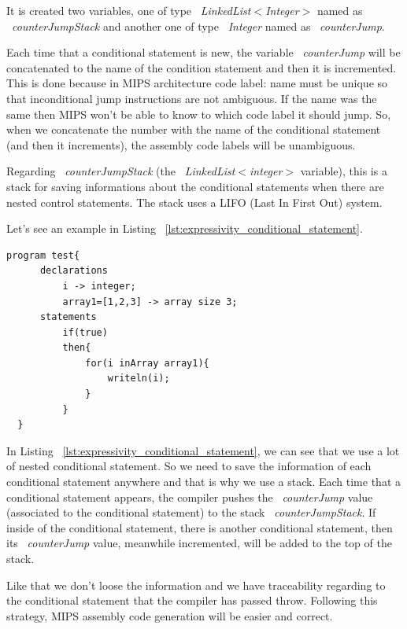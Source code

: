 \documentclass[
  oneside,
  11pt, a4paper,
  footinclude=true,
  headinclude=true,
  cleardoublepage=empty
]{scrbook}
\begin{document}
It is created two variables, one of type ~\textit{LinkedList$<$Integer$>$} named as ~\textit{counterJumpStack} and another one of type ~\textit{Integer} named as ~\textit{counterJump}.

Each time that a conditional statement is new, the variable ~\textit{counterJump} will be concatenated to the name of the condition statement and then it is incremented. This is done because in MIPS architecture code label: name must be unique so that inconditional jump instructions are not ambiguous. If the name was the same then MIPS won't be able to know to which code label it should jump. So, when we concatenate the number with the name of the conditional statement (and then it increments), the assembly code labels will be unambiguous.

Regarding ~\textit{counterJumpStack} (the ~\textit{LinkedList$<$integer$>$} variable), this is a stack for saving informations about the conditional statements when there are nested control statements. The stack uses a LIFO (Last In First Out) system.

Let's see an example in Listing ~\ref{lst:expressivity_conditional_statement}.

\begin{lstlisting}[caption={Example of conditional statements in LISS language},label={lst:expressivity_conditional_statement}]
  program test{
      declarations
          i -> integer;
          array1=[1,2,3] -> array size 3;
      statements
          if(true)
          then{
              for(i inArray array1){
                  writeln(i);
              }
          }
  }
\end{lstlisting}

In Listing ~\ref{lst:expressivity_conditional_statement}, we can see that we use a lot of nested conditional statement.
So we need to save the information of each conditional statement anywhere and that is why we use a stack.
Each time that a conditional statement appears, the compiler pushes the ~\textit{counterJump} value (associated to the conditional statement) to the stack ~\textit{counterJumpStack}. If inside of the conditional statement, there is another conditional statement, then its ~\textit{counterJump} value, meanwhile incremented, will be added to the top of the stack. 

Like that we don't loose the information and we have traceability regarding to the conditional statement that the compiler has passed throw. Following this strategy, MIPS assembly code generation will be easier and correct.
\end{document}
